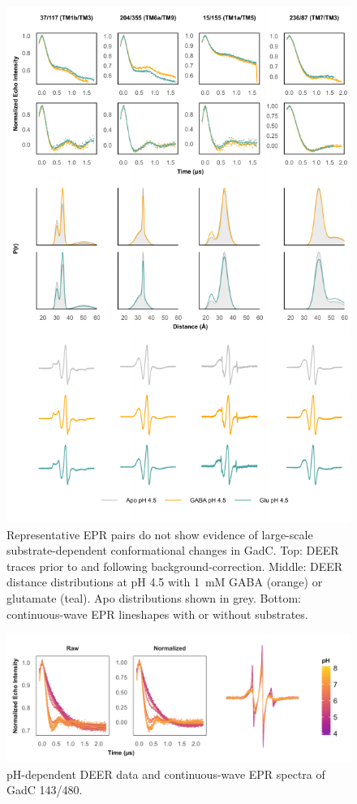 \begin{figure}[h]
\centering
\includegraphics[width=5in]{Figures/gadc_supp_substrates.pdf}
\caption[Representative EPR pairs do not show evidence of large-scale substrate-dependent conformational changes in GadC.]{Representative EPR pairs do not show evidence of large-scale substrate-dependent conformational changes in GadC. Top: DEER traces prior to and following background-correction. Middle: DEER distance distributions at pH 4.5 with \SI{1}{mM} GABA (orange) or glutamate (teal). Apo distributions shown in grey. Bottom: continuous-wave EPR lineshapes with or without substrates.}
\label{fig:gadc_supp_substrates}
\end{figure}

\begin{figure}[h]
\centering
\includegraphics[width=5in]{Figures/gadc_supp_tail.pdf}
\caption[pH-dependent DEER data and continuous-wave EPR spectra of GadC 143/480.]{pH-dependent DEER data and continuous-wave EPR spectra of GadC 143/480.}
\label{fig:gadc_supp_tail}
\end{figure}

